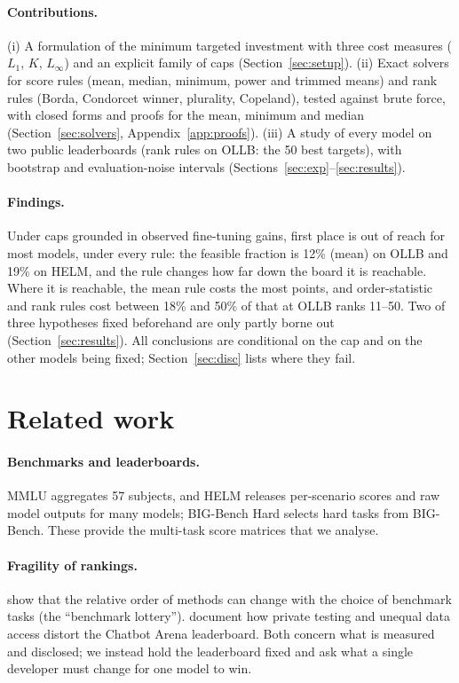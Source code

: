 \documentclass{article}
\begin{document}
\paragraph{Contributions.}
(i) A formulation of the minimum targeted investment with three cost measures ($L_1$, $K$, $L_\infty$) and an explicit family of caps (Section~\ref{sec:setup}). (ii) Exact solvers for score rules (mean, median, minimum, power and trimmed means) and rank rules (Borda, Condorcet winner, plurality, Copeland), tested against brute force, with closed forms and proofs for the mean, minimum and median (Section~\ref{sec:solvers}, Appendix~\ref{app:proofs}). (iii) A study of every model on two public leaderboards (rank rules on OLLB: the 50 best targets), with bootstrap and evaluation-noise intervals (Sections~\ref{sec:exp}--\ref{sec:results}).

\paragraph{Findings.}
Under caps grounded in observed fine-tuning gains, first place is out of reach for most models, under every rule: the feasible fraction is 12\% (mean) on OLLB and 19\% on HELM, and the rule changes how far down the board it is reachable. Where it is reachable, the mean rule costs the most points, and order-statistic and rank rules cost between 18\% and 50\% of that at OLLB ranks 11--50. Two of three hypotheses fixed beforehand are only partly borne out (Section~\ref{sec:results}). All conclusions are conditional on the cap and on the other models being fixed; Section~\ref{sec:disc} lists where they fail.

\section{Related work}
\label{sec:related}
\paragraph{Benchmarks and leaderboards.}
MMLU \citep{hendrycks2021mmlu} aggregates 57 subjects, and HELM \citep{liang2023helm} releases per-scenario scores and raw model outputs for many models; BIG-Bench Hard \citep{suzgun2023bbh} selects hard tasks from BIG-Bench. These provide the multi-task score matrices that we analyse.

\paragraph{Fragility of rankings.}
\citet{dehghani2021lottery} show that the relative order of methods can change with the choice of benchmark tasks (the ``benchmark lottery''). \citet{singh2025illusion} document how private testing and unequal data access distort the Chatbot Arena leaderboard. Both concern what is measured and disclosed; we instead hold the leaderboard fixed and ask what a single developer must change for one model to win.
\end{document}
